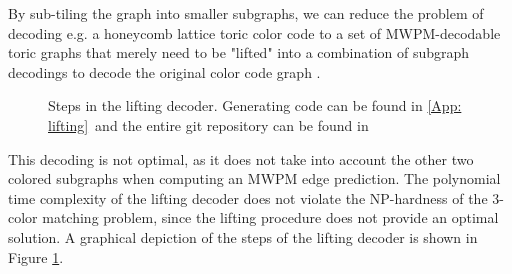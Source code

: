 By sub-tiling
the graph into smaller subgraphs, we can reduce the problem of decoding
e.g. a honeycomb lattice toric color code to a set of
MWPM-decodable toric graphs that merely need to be "lifted" into a 
combination of subgraph decodings to decode the original color code
graph \cite{delfosse}. 
\begin{figure}[h!]
    \centering
    \hfill
    \hfill
    \hfill
    \caption{Steps in the lifting decoder. Generating code can be found in \ref{App: lifting}\
    and the entire git repository can be found in \cite{clemens}}
    \label{fig: lifting}
\end{figure}

This decoding is not optimal, as it does not take into account the other two colored
subgraphs when computing an MWPM edge prediction.
The polynomial time complexity of the lifting decoder does not
violate the NP-hardness of the 3-color matching problem, since the 
lifting procedure does not provide an optimal solution.
A graphical depiction of the steps of the lifting decoder is shown in
Figure \ref{fig: lifting}.
\newpage